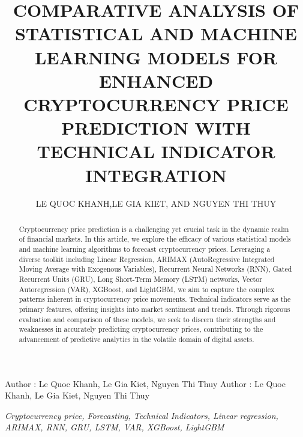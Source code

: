 \documentclass{ieeeojies}
\begin{document}
\title{\centering COMPARATIVE ANALYSIS OF STATISTICAL AND MACHINE LEARNING MODELS FOR ENHANCED CRYPTOCURRENCY PRICE PREDICTION WITH TECHNICAL INDICATOR INTEGRATION}

\author{\uppercase{Le Quoc Khanh},\uppercase{Le Gia Kiet, and Nguyen Thi Thuy}}

\address[1]{Faculty of Information Systems, University of Information Technology, (e-mail: 21520283@gm.uit.edu.vn)}
\address[2]{Faculty of Information Systems, University of Information Technology, (e-mail: 21522255@gm.uit.edu.vn)}
\address[3]{Faculty of Information Systems, University of Information Technology, (e-mail: 25122662@gm.uit.edu.vn)}

\markboth
{Author \headeretal: Le Quoc Khanh, Le Gia Kiet, Nguyen Thi Thuy}
{Author \headeretal: Le Quoc Khanh, Le Gia Kiet, Nguyen Thi Thuy}

\begin{abstract}
    Cryptocurrency price prediction is a challenging yet crucial task in the dynamic realm of financial markets. In this article, we explore the efficacy of various statistical models and machine learning algorithms to forecast cryptocurrency prices. Leveraging a diverse toolkit including Linear Regression, ARIMAX (AutoRegressive Integrated Moving Average with Exogenous Variables), Recurrent Neural Networks (RNN), Gated Recurrent Units (GRU), Long Short-Term Memory (LSTM) networks, Vector Autoregression (VAR), XGBoost, and LightGBM, we aim to capture the complex patterns inherent in cryptocurrency price movements. Technical indicators serve as the primary features, offering insights into market sentiment and trends. Through rigorous evaluation and comparison of these models, we seek to discern their strengths and weaknesses in accurately predicting cryptocurrency prices, contributing to the advancement of predictive analytics in the volatile domain of digital assets.
\end{abstract}

\begin{keywords}
    \textit{Cryptocurrency price, Forecasting, Technical Indicators, Linear regression, ARIMAX, RNN, GRU, LSTM, VAR, XGBoost, LightGBM}
\end{keywords}

\titlepgskip=-15pt

\maketitle
\end{document}
